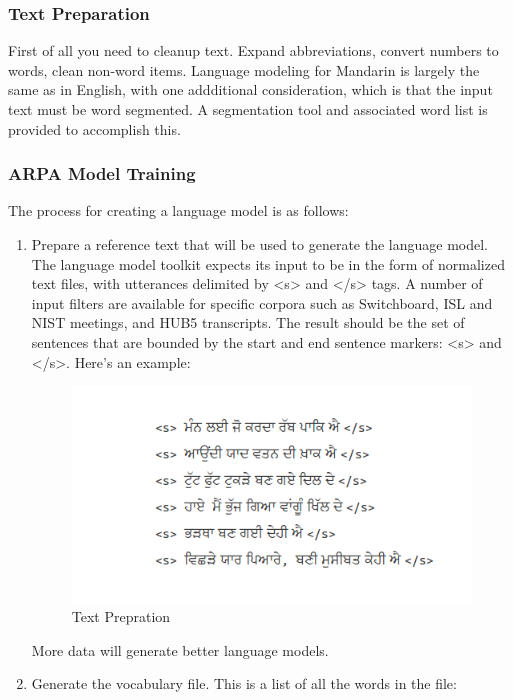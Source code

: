 \documentclass[12pt,a4paper,oneside]{memoir}
\begin{document}
\subsubsection{Text Preparation}
First of all you need to cleanup text. Expand abbreviations, convert numbers to words, clean non-word items. Language modeling for Mandarin is largely the same as in English, with one addditional consideration, which is that the input text must be word segmented. A segmentation tool and associated word list is provided to accomplish this. 
\subsubsection{ARPA Model Training}
The process for creating a language model is as follows:
\begin{enumerate}
  \item  Prepare a reference text that will be used to generate the language model. The language model toolkit expects its input to be in the form of normalized text files, with utterances delimited by <s> and </s> tags. A number of input filters are available for specific corpora such as Switchboard, ISL and NIST meetings, and HUB5 transcripts. The result should be the set of sentences that are bounded by the start and end sentence markers: <s> and </s>. Here's an example: 

\begin{figure}[h]
    \centering
    \includegraphics[scale=1.0]{Screenshot2}
    \caption{Text Prepration}
\end{figure}

More data will generate better language models. 

  \item  Generate the vocabulary file. This is a list of all the words in the file:


\end{enumerate}
\end{document}
